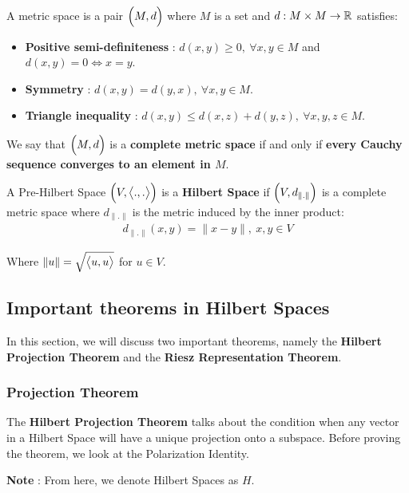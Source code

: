 \begin{definition}
    A metric space is a pair $\Big( M, d \Big)$ where $M$ is a set and $d:M\times M\to \mathbb{R}$ satisfies:
    \begin{itemize}
        \item \textbf{Positive semi-definiteness} : $d(x, y) \ge 0, \ \forall x, y \in M$ and $d(x, y) = 0 \iff x = y$.
        \item \textbf{Symmetry} : $d(x, y) = d(y, x), \ \forall x, y \in M$.
        \item \textbf{Triangle inequality} : $d(x, y) \le d(x, z) + d(y, z), \ \forall x, y, z \in M$.
    \end{itemize}

    \noindent We say that $\Big( M, d \Big)$ is a \textbf{complete metric space} if and only if \textbf{every Cauchy sequence converges to an element in $M$}.
\end{definition}

\begin{definition}
    A Pre-Hilbert Space $\Big( V, \big<.,.\big> \Big)$ is a \textbf{Hilbert Space} if $\Big( V, d_{\|.\|} \Big)$ is a complete metric space where $d_{\|.\|}$ is the metric induced by the inner product:
    \begin{align*}
        d_{\|.\|}(x, y) = \|x - y\|, \ x, y \in V
    \end{align*}

    \noindent Where $\|u\| = \sqrt{\big<u, u\big>}$ for $u\in V$.
\end{definition}

\subsection{Important theorems in Hilbert Spaces}
In this section, we will discuss two important theorems, namely the \textbf{Hilbert Projection Theorem} and the \textbf{Riesz Representation Theorem}.

\subsubsection{Projection Theorem}
The \textbf{Hilbert Projection Theorem} talks about the condition when any vector in a Hilbert Space will have a unique projection onto a subspace. Before proving the theorem, we look at the Polarization Identity.

\noindent \textbf{Note} : From here, we denote Hilbert Spaces as $H$.

